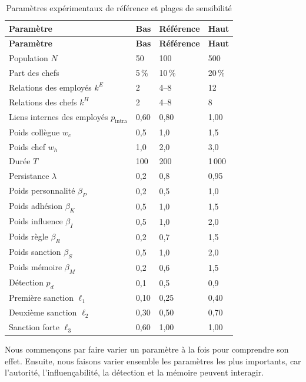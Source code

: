 \documentclass[11pt,a4paper]{article}
\begin{document}
\begin{longtable}{L{43mm}C{24mm}C{24mm}C{24mm}}
\caption{Paramètres expérimentaux de référence et plages de sensibilité}
\label{tab:params}\\
\toprule
{}
\color{white}\textbf{Paramètre} &
\color{white}\textbf{Bas} &
\color{white}\textbf{Référence} &
\color{white}\textbf{Haut}\\
\midrule
\endfirsthead
\toprule
{}
\color{white}\textbf{Paramètre} &
\color{white}\textbf{Bas} &
\color{white}\textbf{Référence} &
\color{white}\textbf{Haut}\\
\midrule
\endhead
Population $N$ & 50 & 100 & 500\\
Part des chefs & 5\,\% & 10\,\% & 20\,\%\\
Relations des employés $k^E$ & 2 & 4--8 & 12\\
Relations des chefs $k^H$ & 2 & 4--8 & 8\\
Liens internes des employés $p_{\mathrm{intra}}$ & 0,60 & 0,80 & 1,00\\
Poids collègue $w_c$ & 0,5 & 1,0 & 1,5\\
Poids chef $w_h$ & 1,0 & 2,0 & 3,0\\
Durée $T$ & 100 & 200 & 1\,000\\
Persistance $\lambda$ & 0,2 & 0,8 & 0,95\\
Poids personnalité $\beta_P$ & 0,2 & 0,5 & 1,0\\
Poids adhésion $\beta_K$ & 0,5 & 1,0 & 1,5\\
Poids influence $\beta_I$ & 0,5 & 1,0 & 2,0\\
Poids règle $\beta_R$ & 0,2 & 0,7 & 1,5\\
Poids sanction $\beta_S$ & 0,5 & 1,0 & 2,0\\
Poids mémoire $\beta_M$ & 0,2 & 0,6 & 1,5\\
Détection $p_d$ & 0,1 & 0,5 & 0,9\\
Première sanction $\ell_1$ & 0,10 & 0,25 & 0,40\\
Deuxième sanction $\ell_2$ & 0,30 & 0,50 & 0,70\\
Sanction forte $\ell_3$ & 0,60 & 1,00 & 1,00\\
\bottomrule
\end{longtable}

Nous commençons par faire varier un paramètre à la fois pour comprendre son
effet. Ensuite, nous faisons varier ensemble les paramètres les plus importants,
car l’autorité, l’influençabilité, la détection et la mémoire peuvent interagir.
\end{document}
